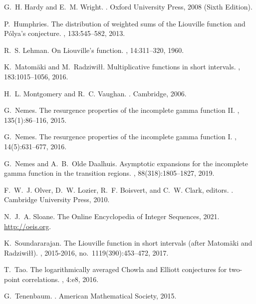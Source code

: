 \documentclass[11pt,reqno,a4letter]{article}
\numberwithin{equation}{section}
\numberwithin{figure}{section}
\numberwithin{table}{section}
\theoremstyle{plain}
\numberwithin{theorem}{section}
\theoremstyle{definition}
\theoremstyle{remark}
\begin{document}
\begin{thebibliography}{10}
G.~H. Hardy and E.~M. Wright.
.
\newblock Oxford University Press, 2008 (Sixth Edition).

P.~Humphries.
\newblock The distribution of weighted sums of the {L}iouville function and
  {P}\'{o}lya's conjecture.
, 133:545--582, 2013.

R.~S. Lehman.
\newblock On {L}iouville's function.
, 14:311--320, 1960.

K.~Matom{\"{a}}ki and M.~Radziwi{\l\l}.
\newblock Multiplicative functions in short intervals.
, 183:1015--1056, 2016.

H.~L. Montgomery and R.~C. Vaughan.
.
\newblock Cambridge, 2006.

G.~Nemes.
\newblock The resurgence properties of the incomplete gamma function {II}.
, 135(1):86--116, 2015.

G.~Nemes.
\newblock The resurgence properties of the incomplete gamma function {I}.
, 14(5):631--677, 2016.

G.~Nemes and A.~B.~Olde Daalhuis.
\newblock Asymptotic expansions for the incomplete gamma function in the
  transition regions.
, 88(318):1805--1827, 2019.

F.~W.~J. Olver, D.~W. Lozier, R.~F. Boisvert, and C.~W. Clark, editors.
.
\newblock Cambridge University Press, 2010.

N.~J.~A. Sloane.
\newblock The {O}nline {E}ncyclopedia of {I}nteger {S}equences, 2021.
\newblock \url{http://oeis.org}.

K.~Soundararajan.
\newblock The {L}iouville function in short intervals (after {M}atom{\"{a}}ki
  and {R}adziwi{\l}{\l}).
, 2015-2016, no.~1119(390):453--472, 2017.

T.~Tao.
\newblock The logarithmically averaged {C}howla and {E}lliott conjectures for
  two-point correlations.
, 4:e8, 2016.

G.~Tenenbaum.
.
\newblock American Mathematical Society, 2015.

\end{thebibliography}
\end{document}
